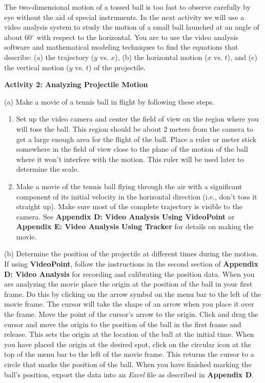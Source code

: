 The two-dimensional motion of a tossed ball is too fast to observe carefully
by eye without the aid of special instruments. In the next activity we will
use a video analysis system to study the motion of a small ball launched at
an angle of about 60\( ^{\circ } \) with respect to the horizontal. You are
to use the video analysis software and mathematical modeling techniques to find
the equations that describe: (a) the trajectory ($y$ vs. $x$), 
(b) the horizontal
motion ($x$ vs. $t$), and (c) the vertical motion ($y$ vs. 
$t$) of the projectile.

\textbf{Activity 2: Analyzing Projectile Motion} 

(a) Make a movie of a tennis ball in flight by following these steps. 

\begin{enumerate}
\item Set up the video camera and center the field of view on the region where you
will toss the ball. This region should be about 2 meters from the camera to
get a large enough area for the flight of the ball. Place a ruler or meter stick
somewhere in the field of view close to the plane of the motion of the ball
where it won't interfere with the motion. This ruler will be used later to determine
the scale. 
\item Make a movie of the tennis ball flying through the air with a significant component
of its initial velocity in the horizontal direction (i.e., don't toss it straight
up). Make sure most of the complete trajectory is visible to the camera. See
\textbf{Appendix D: Video Analysis Using VideoPoint} or \textbf{Appendix E: Video Analysis Using Tracker} for details on making the movie. 

\end{enumerate}
(b) Determine the position of the projectile at different times during the 
motion. If using \textbf{VideoPoint}, follow the instructions in the second section of 
\textbf{Appendix D: Video Analysis} for recording and calibrating the position data. When you
are analyzing the movie place the origin at the position of the ball in your
first frame. Do this by clicking on the arrow symbol on the menu bar to the
left of the movie frame. The cursor will take the shape of an arrow when you
place it over the frame. Move the point of the cursor's arrow to the origin.
Click and drag the cursor and move the origin to the position of the ball in
the first frame and release. This sets the origin at the location of the ball
at the initial time. When you have placed the origin at the desired spot, click
on the circular icon at the top of the menu bar to the left of the movie frame.
This returns the cursor to a circle that marks the position of the ball.
When you have finished marking the ball's position, export the data into
an \textit{Excel} file as described in \textbf{Appendix D}.

